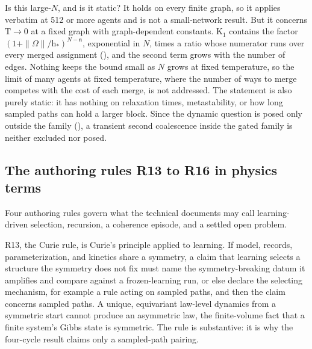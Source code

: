 Is this large-\(N\), and is it static? It holds on every finite graph, so it applies verbatim at 512 or more
agents and is not a small-network result. But it concerns \(\mathrm T\to0\) at a fixed graph with
graph-dependent constants. \(\mathrm K_1\) contains the factor \((1+\|\Omega\|/\mathrm h_*)^{N-\mathfrak n}\),
exponential in \(N\), times a ratio whose numerator runs over every merged assignment
(), and the second term grows with the number of edges. Nothing keeps the bound
small as \(N\) grows at fixed temperature, so the limit of many agents at fixed temperature, where the number
of ways to merge competes with the cost of each merge, is not addressed. The statement is also purely
static: it has nothing on relaxation times, metastability, or how long sampled paths can hold a larger block.
Since the dynamic question is posed only outside the family (), a transient
second coalescence inside the gated family is neither excluded nor posed.

\subsection{The authoring rules R13 to R16 in physics terms}
\label{comp:ch13-rules}

Four authoring rules govern what the technical documents may call learning-driven selection, recursion, a
coherence episode, and a settled open problem.

R13, the Curie rule, is Curie's principle applied to learning. If model, records, parameterization, and
kinetics share a symmetry, a claim that learning selects a structure the symmetry does not fix must name
the symmetry-breaking datum it amplifies and compare against a frozen-learning run, or else declare the
selecting mechanism, for example a rule acting on sampled paths, and then the claim concerns sampled paths.
A unique, equivariant law-level dynamics from a symmetric start cannot produce an asymmetric law, the
finite-volume fact that a finite system's Gibbs state is symmetric. The rule is substantive: it is why the
four-cycle result claims only a sampled-path pairing.

